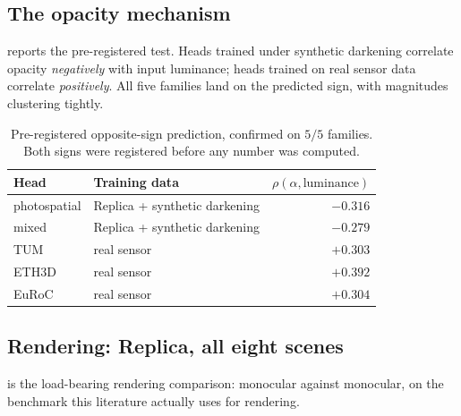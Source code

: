 \subsection{The opacity mechanism}
\label{sec:exp:mech}
 reports the pre-registered test. Heads trained under synthetic
darkening correlate opacity \emph{negatively} with input luminance; heads
trained on real sensor data correlate \emph{positively}. All five families
land on the predicted sign, with magnitudes clustering tightly.

\begin{table}[t]
\centering\small
\begin{tabular}{@{}llr@{}}
\toprule
Head & Training data & $\rho(\alpha,\text{luminance})$ \\
\midrule
photospatial & Replica + synthetic darkening & $-0.316$ \\
mixed        & Replica + synthetic darkening & $-0.279$ \\
TUM          & real sensor                   & $+0.303$ \\
ETH3D        & real sensor                   & $+0.392$ \\
EuRoC        & real sensor                   & $+0.304$ \\
\bottomrule
\end{tabular}
\caption{Pre-registered opposite-sign prediction, confirmed on $5/5$ families.
Both signs were registered before any number was computed.}
\label{tab:lum}
\end{table}

\subsection{Rendering: Replica, all eight scenes}
\label{sec:exp:replica}
 is the load-bearing rendering comparison: monocular against
monocular, on the benchmark this literature actually uses for rendering.

